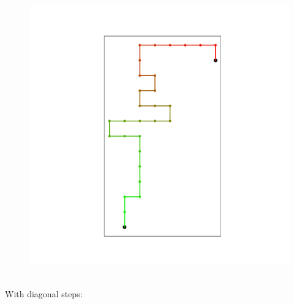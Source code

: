 \begin{figure}[h!]
\begin{minipage}{.5\linewidth}
{            \includegraphics[scale=.45]{./figures/SAW.pdf}
          }
        \end{minipage}
    \end{figure} \ \\
    With diagonal steps:
